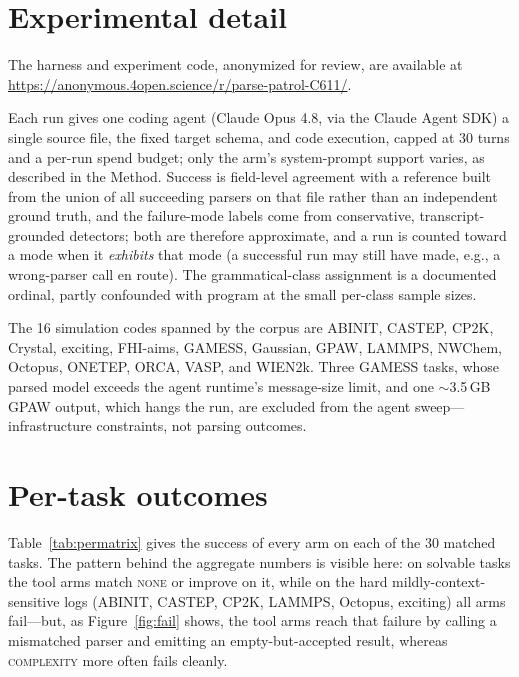 \documentclass{article}
\begin{document}
\clearpage
{\small


}

\clearpage
\appendix
\newcommand{\cmark}{\checkmark}
\newcommand{\xmark}{--}

\section{Experimental detail}\label{app:setup}

The harness and experiment code, anonymized for review, are available at
\url{https://anonymous.4open.science/r/parse-patrol-C611/}.

Each run gives one coding agent (Claude Opus 4.8, via the Claude Agent SDK) a single
source file, the fixed target schema, and code execution, capped at 30 turns and a
per-run spend budget; only the arm's system-prompt support varies, as described in the
Method. Success is field-level agreement with a reference built from the union of all
succeeding parsers on that file rather than an independent ground truth, and the
failure-mode labels come from conservative, transcript-grounded detectors; both are
therefore approximate, and a run is counted toward a mode when it \emph{exhibits} that
mode (a successful run may still have made, e.g., a wrong-parser call en route). The
grammatical-class assignment is a documented ordinal, partly confounded with program at
the small per-class sample sizes.

The 16 simulation codes spanned by the corpus are ABINIT, CASTEP, CP2K, Crystal,
exciting, FHI-aims, GAMESS, Gaussian, GPAW, LAMMPS, NWChem, Octopus, ONETEP, ORCA, VASP,
and WIEN2k. Three GAMESS tasks, whose parsed model exceeds the agent runtime's
message-size limit, and one $\sim$3.5\,GB GPAW output, which hangs the run, are excluded
from the agent sweep---infrastructure constraints, not parsing outcomes.

\section{Per-task outcomes}

Table~\ref{tab:permatrix} gives the success of every arm on each of the 30 matched tasks.
The pattern behind the aggregate numbers is visible here: on solvable tasks the tool arms
match \textsc{none} or improve on it, while on the hard mildly-context-sensitive logs
(ABINIT, CASTEP, CP2K, LAMMPS, Octopus, exciting) all arms fail---but, as
Figure~\ref{fig:fail} shows, the tool arms reach that failure by calling a mismatched
parser and emitting an empty-but-accepted result, whereas \textsc{complexity} more often
fails cleanly.
\end{document}
